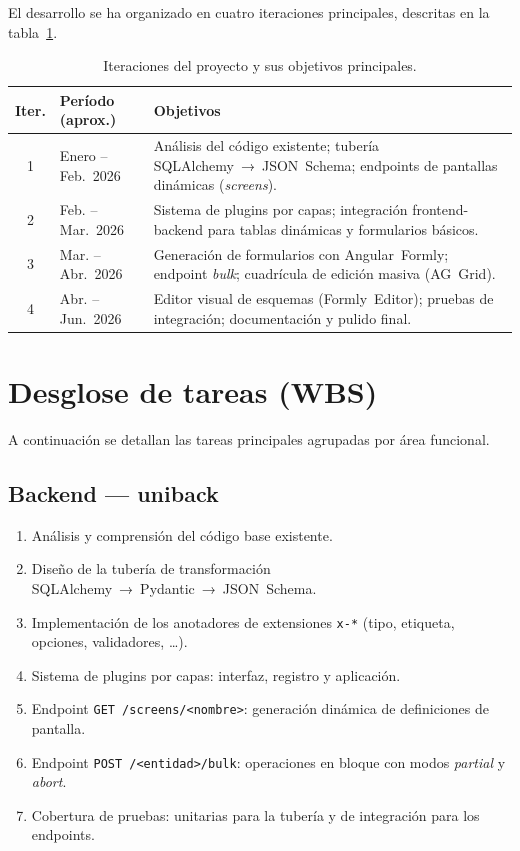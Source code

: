 El desarrollo se ha organizado en cuatro iteraciones principales, descritas en la
tabla~\ref{tab:iteraciones}.

\begin{table}[H]
  \centering
  \caption{Iteraciones del proyecto y sus objetivos principales.}
  \label{tab:iteraciones}
  \begin{tabular}{clp{7cm}}
    \toprule
    \textbf{Iter.} & \textbf{Período (aprox.)} & \textbf{Objetivos} \\
    \midrule
    1 & Enero -- Feb.~2026 &
      Análisis del código existente; tubería SQLAlchemy~→~JSON~Schema;
      endpoints de pantallas dinámicas (\textit{screens}). \\
    2 & Feb. -- Mar.~2026 &
      Sistema de plugins por capas; integración frontend-backend para
      tablas dinámicas y formularios básicos. \\
    3 & Mar. -- Abr.~2026 &
      Generación de formularios con Angular~Formly; endpoint
      \textit{bulk}; cuadrícula de edición masiva (AG~Grid). \\
    4 & Abr. -- Jun.~2026 &
      Editor visual de esquemas (Formly~Editor); pruebas de integración;
      documentación y pulido final. \\
    \bottomrule
  \end{tabular}
\end{table}

\section{Desglose de tareas (WBS)}
\label{sec:wbs}

A continuación se detallan las tareas principales agrupadas por área funcional.

\subsection{Backend — uniback}
\label{subsec:wbs-backend}

\begin{enumerate}[label=B\arabic*.]
  \item Análisis y comprensión del código base existente.
  \item Diseño de la tubería de transformación SQLAlchemy~→~Pydantic~→~JSON~Schema.
  \item Implementación de los anotadores de extensiones \texttt{x-*} (tipo, etiqueta,
    opciones, validadores, \ldots).
  \item Sistema de plugins por capas: interfaz, registro y aplicación.
  \item Endpoint \texttt{GET /screens/<nombre>}: generación dinámica de definiciones de
    pantalla.
  \item Endpoint \texttt{POST /<entidad>/bulk}: operaciones en bloque con modos
    \textit{partial} y \textit{abort}.
  \item Cobertura de pruebas: unitarias para la tubería y de integración para los
    endpoints.
\end{enumerate}

